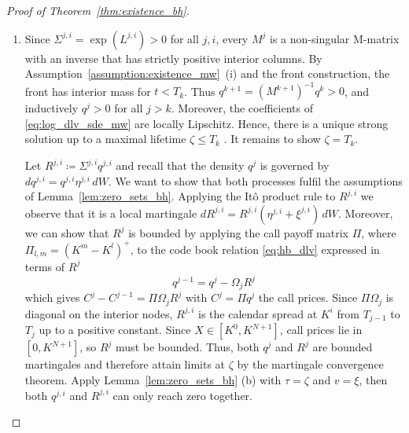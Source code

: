 \documentclass[11pt]{article}
\theoremstyle{plain}
\theoremstyle{definition}
\theoremstyle{remark}
\begin{document}
\begin{proof}[Proof of Theorem~\ref{thm:existence_bh}]
\begin{enumerate}[label=(\roman*)]
  \item Since $\Sigma^{j, i} = \exp(L^{j, i}) > 0$ for all $j, i$, every $ M^j $ is a non-singular M-matrix with an inverse that has strictly positive interior columns. By Assumption~\ref{assumption:existence_mw}~(i) and the front construction, the front has interior mass for $t < T_k$. Thus $q^{k+1}=(M^{k+1})^{-1}q^k > 0$, and inductively $q^j>0$ for all $j>k$. Moreover, the coefficients of \eqref{eq:log_dlv_sde_mw} are locally Lipschitz. Hence, there is a unique strong solution up to a maximal lifetime $\zeta \leq T_k$ \citep[Theorem~V.38]{Protter2005}. It remains to show $\zeta = T_k$.
  
  Let $R^{j, i} \coloneqq \Sigma^{j, i} q^{j, i}$ and recall that the density $q^{j}$ is governed by $dq^{j, i} = q^{j, i} \eta^{j, i} \, dW$. We want to show that both processes fulfil the assumptions of Lemma~\ref{lem:zero_sets_bh}. Applying the It\^o product rule to $R^{j, i}$ we observe that it is a local martingale $dR^{j,i} = R^{j,i} ( \eta^{j,i}+\xi^{j,i} ) \, dW$. Moreover, we can show that $R^j$ is bounded by applying the call payoff matrix $\Pi$, where $\Pi_{l, m} = (K^m - K^l)^+$, to the code book relation \eqref{eq:hb_dlv} expressed in terms of $R^j$
  \begin{equation}
    \label{eq:R_codebook_mw}
    q^{j-1}=q^j - \Omega_jR^j 
  \end{equation}
  which gives $C^{j} - C^{j-1} = \Pi\Omega_j R^j $ with $C^j = \Pi q^j$ the call prices. Since $\Pi\Omega_j$ is diagonal on the interior nodes, $R^{j, i}$ is the calendar spread at $K^{i}$ from $T_{j-1}$ to $T_j$ up to a positive constant. Since $X \in [K^0, K^{N+1}]$, call prices lie in $[0, K^{N+1}]$, so $R^{j}$ must be bounded. Thus, both $q^j$ and $R^j$ are bounded martingales and therefore attain limits at $\zeta$ by the martingale convergence theorem. Apply Lemma~\ref{lem:zero_sets_bh} (b) with $\tau=\zeta$ and $v=\xi$, then both $q^{j, i}$ and $R^{j, i}$ can only reach zero together. 


\end{enumerate}
\end{proof}
\end{document}
